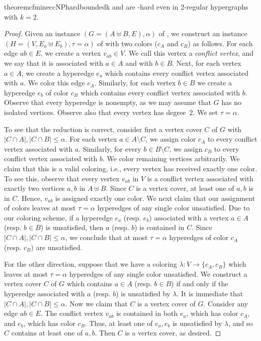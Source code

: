 \begin{restatable}{theorem}{cfmineccNPhardboundedk}\label{thm:cfminecc-NPhard-k2}
    \cfminECC{} and \cfmaxECC{} are -hard even in 2-regular hypergraphs with $k = 2$.
\end{restatable}
\begin{proof}
    Given an instance $(G = (A \uplus B, E), \alpha)$ of \fairbipartiteVC{}, we construct an instance
    $(H = (V, E_a \uplus E_b), \tau = \alpha)$ of \cfminECC{} with two colors ($c_A$ and $c_B$) as follows.
    For each edge $ab \in E$, we create a vertex $v_{ab} \in V$.
    We call this vertex a \emph{conflict vertex}, and we say that it is associated with $a \in A$ and with $b \in B$.
    Next, for each vertex $a \in A$, we create a hyperedge $e_a$ which contains every conflict vertex associated with $a$. We color this edge $c_A$.
    Similarly, for each vertex $b \in B$ we create a hyperedge $e_b$ of color $c_B$ which contains every conflict vertex associated with $b$.
    Observe that every hyperedge is nonempty, as we may assume that $G$ has no isolated vertices.
    Observe also that every vertex has degree~$2$.
    We set $\tau = \alpha$.

    To see that the reduction is correct, consider first a vertex cover $C$ of $G$ with $|C \cap A|, |C \cap B| \leq \alpha$.
    For each vertex $a \in A \setminus C$, we assign color $c_A$ to every conflict vertex associated with $a$.
    Similarly, for every $b \in B \setminus C$, we assign $c_B$ to every conflict vertex associated with $b$.
    We color remaining vertices arbitrarily. We claim that this is a valid coloring, i.e., every vertex has received exactly one color.
    To see this, observe that every vertex $v_{ab}$ in $V$ is a conflict vertex associated with exactly two vertices $a, b$ in $A \uplus B$.
    Since $C$ is a vertex cover, at least one of $a, b$ is in $C$. Hence, $v_{ab}$ is assigned exactly one color. We next claim that
    our assignment of colors leaves at most $\tau = \alpha$ hyperedges of any single color unsatisfied. Due to our coloring scheme,
    if a hyperedge $e_a$ (resp. $e_b$) associated with a vertex $a \in A$ (resp. $b \in B$) is unsatisfied, then
    $a$ (resp. $b$) is contained in $C$. Since $|C \cap A|, |C \cap B| \leq \alpha$, we conclude that at most $\tau = \alpha$ hyperedges
    of color $c_A$ (resp. $c_B$) are unsatisfied.

    For the other direction, suppose that we have a coloring $\lambda\colon V \rightarrow \{c_A, c_B\}$ which leaves at most $\tau = \alpha$ hyperedges
    of any single color unsatisfied. We construct a vertex cover $C$ of $G$ which contains $a \in A$ (resp. $b \in B$) if and only if the hyperedge associated with $a$ (resp. $b$) is unsatisfied by $\lambda$.
    It is immediate that $|C \cap A|, |C \cap B| \leq \alpha$.
    Now we claim that $C$ is a vertex cover of $G$.
    Consider any edge $ab \in E$. The conflict vertex $v_{ab}$ is contained in both $e_a$, which has color $c_A$, and $e_b$, which has color $c_B$.
    Thus, at least one of $e_a, e_b$ is unsatisfied by $\lambda$, and so $C$ contains at least one of $a,b$.
    Then $C$ is a vertex cover, as desired.


\end{proof}
